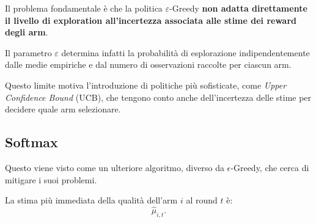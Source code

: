 Il problema fondamentale è che la politica $\varepsilon$-Greedy
\textbf{non adatta direttamente il livello di exploration
all'incertezza associata alle stime dei reward degli arm}.

Il parametro $\varepsilon$ determina infatti la probabilità
di esplorazione indipendentemente dalle medie empiriche
e dal numero di osservazioni raccolte per ciascun arm.

Questo limite motiva l'introduzione di politiche più sofisticate,
come \textit{Upper Confidence Bound} (UCB), che tengono conto
anche dell'incertezza delle stime per decidere quale arm selezionare.

\newpage

\subsection{Softmax}
Questo viene visto come un ulteriore algoritmo, diverso da $\epsilon$-Greedy, che cerca di mitigare i suoi problemi.

La stima più immediata della qualità dell'arm $i$ al round $t$ è:
\[
\widehat{\mu}_{i,t}.
\]

